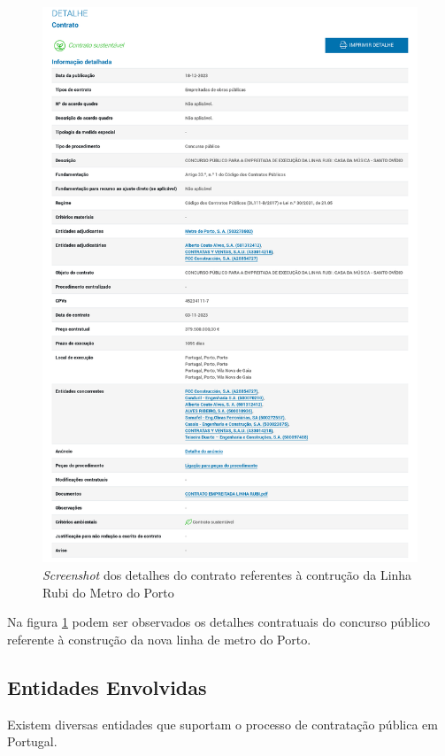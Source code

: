 \begin{figure}[H]
	\centering
	\includegraphics[width=.95\textwidth]{imagens/metro.png}
	\caption{\textit{Screenshot} dos detalhes do contrato referentes à contrução da Linha Rubi do Metro do Porto}
	\label{fig:site4}
\end{figure}

Na figura \ref{fig:site4} podem ser observados os detalhes contratuais do concurso público referente à construção da nova linha de metro do Porto.

\subsection{Entidades Envolvidas}

Existem diversas entidades que suportam o processo de contratação pública em Portugal. 

